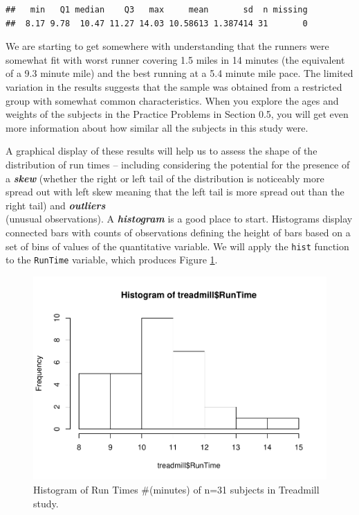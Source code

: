 \documentclass[]{book}
\newenvironment{Shaded}{\begin{snugshade}}{\end{snugshade}}
\newcommand{\KeywordTok}[1]{\textcolor[rgb]{0.13,0.29,0.53}{\textbf{{#1}}}}
\newcommand{\NormalTok}[1]{{#1}}
\begin{document}
\begin{verbatim}
##   min   Q1 median    Q3   max     mean       sd  n missing
##  8.17 9.78  10.47 11.27 14.03 10.58613 1.387414 31       0
\end{verbatim}

We are starting to get somewhere with understanding that the runners
were somewhat fit with worst runner covering 1.5 miles in 14 minutes
(the equivalent of a 9.3 minute mile) and the best running at a 5.4
minute mile pace. The limited variation in the results suggests that the
sample was obtained from a restricted group with somewhat common
characteristics. When you explore the ages and weights of the subjects
in the Practice Problems in Section 0.5, you will get even more
information about how similar all the subjects in this study were.

A graphical display of these results will help us to assess the shape of
the distribution of run times -- including considering the potential for
the presence of a \textbf{\emph{skew}} (whether the right or left tail
of the distribution is noticeably more spread out with left skew meaning
that the left tail is more spread out than the right tail) and
\textbf{\emph{outliers}}\\
(unusual observations). A \textbf{\emph{histogram }} is a good place to
start. Histograms display connected bars with counts of observations
defining the height of bars based on a set of bins of values of the
quantitative variable. We will apply the \texttt{hist} function to the
\texttt{RunTime} variable, which produces Figure \ref{fig:Figure5}.




\begin{Shaded}
\end{Shaded}

\begin{figure}[htbp]
\centering
\includegraphics{GreenwoodBanner_files/figure-latex/Figure5-1.pdf}
\caption{\label{fig:Figure5}Histogram of Run Times \#(minutes) of n=31 subjects in
Treadmill study.}
\end{figure}
\end{document}
